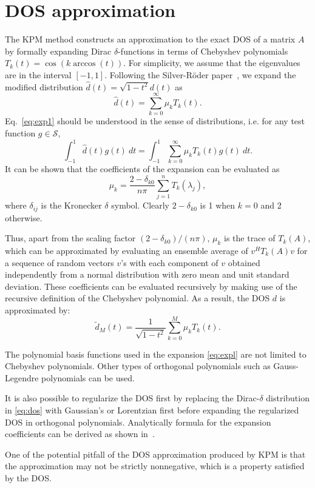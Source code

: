 \documentclass{article}
\newcommand{\beeq}[1]{\begin{equation}\label{#1}}
\newcommand{\eneq}{\end{equation}}
\newcommand{\wt}{\widetilde}
\begin{document}
\section{DOS approximation}
The KPM method constructs an approximation to the exact DOS of a matrix
$A$ by formally expanding Dirac $\delta$-functions in terms of Chebyshev
polynomials $T_{k}(t)=\cos(k\arccos(t))$.
For simplicity, we assume that the eigenvalues are in the interval $[-1,
1]$.   Following the Silver-R\"oder paper~\cite{SilverRoder1994},  
we expand the modified distribution $\hat{d}(t)=\sqrt{1-t^2}d(t)$ as
\beeq{eq:exp1}
\hat d(t)  = \sum_{k=0}^\infty  \mu_k T_k(t).
\end{equation}
Eq.~\eqref{eq:exp1} should be understood in the sense of
distributions, i.e. for any test function $g\in \mathcal{S}$,
\[
\int_{-1}^{1}\hat{d}(t) g(t) \ dt = \int_{-1}^{1}
\sum_{k=0}^{\infty} \mu_{k} T_{k}(t) g(t) \ dt.
\]
It can be shown that the coefficients of the expansion can be evaluated as
\begin{equation} 
\mu_k = \frac{2-\delta_{k0}}{n\pi}  \sum_{j=1}^n  T_k(\lambda_j), 
\label{eq:expmu} 
\end{equation}
where $\delta_{ij}$ is the Kronecker $\delta$ symbol. Clearly
 $2 - \delta_{k0}$ is 1 when $k=0$ and 2 otherwise.

Thus, apart from the scaling factor $(2-\delta_{k0})/(n\pi)$,
 $\mu_k$ is  the trace of $T_k(A)$, which can be approximated by evaluating 
an ensemble average of $v^H T_k(A) v$ for a sequence of random vectors $v$'s with
each component of $v$ obtained independently from a normal
distribution with zero mean and unit standard deviation.  These coefficients can be
evaluated recursively by making use of the recursive definition of the Chebyshev polynomial.  As a result, the DOS $d$ is approximated by:
\beeq{eq:tdosFinal}
\wt{d}_M(t) =
\frac{1}{\sqrt{1-t^2}} \sum_{k=0}^M \mu_k T_k (t) .
\eneq

The polynomial basis functions used in the expansion \eqref{eq:expl} are not limited to Chebyshev polynomials. Other types of orthogonal polynomials such as Gauss-Legendre polynomials can be used. 

It is also possible to regularize the DOS first by replacing the Dirac-$\delta$ distribution in \eqref{eq:dos} with Gaussian's or Lorentzian first before expanding the regularized DOS in orthogonal polynomials. Analytically formula for the expansion coefficients can be derived as shown in~\cite{LSY}.

One of the potential pitfall of the DOS approximation produced by KPM is that the approximation may not be strictly nonnegative, which is a property satisfied by the DOS.
\end{document}
